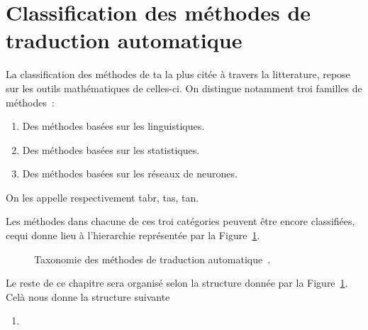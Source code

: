 \section{Classification des méthodes de traduction automatique}

La classification des méthodes de \acrshort{ta} la plus citée à travers la litterature, 
repose sur les outils mathématiques de celles-ci.
On distingue notamment troi familles de méthodes~\cite{deep-nmt-survey}:
\begin{enumerate}
    \item Des méthodes basées sur les linguistiques.
    \item Des méthodes basées sur les statistiques.
    \item Des méthodes basées sur les réseaux de neurones.
\end{enumerate}

On les appelle respectivement \Acrfull{tabr}, \Acrfull{tas}, \Acrfull{tan}.

Les méthodes dans chacune de ces troi catégories peuvent être encore classifiées,
cequi donne lieu à l'hierarchie représentée par la Figure~\ref{fig:mt-taxonomy-tree}.

\begin{figure}
    \begin{center}
       \resizebox{\textwidth}{!}{
         
       }
    \end{center}
    \caption{Taxonomie des méthodes de traduction automatique~\cite{deep-nmt-survey,hybrid-mt}.}
    \label{fig:mt-taxonomy-tree}
\end{figure}

Le reste de ce chapitre sera organisé selon la structure donnée par la Figure~\ref{fig:mt-taxonomy-tree}. 
Celà nous donne la structure suivante

\begin{enumerate}
    \item 
\end{enumerate}
